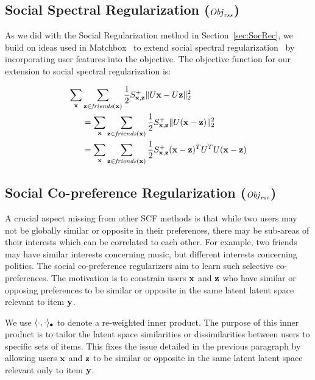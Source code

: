 \subsection{Social Spectral Regularization ($\mathit{Obj}_{\mathit{rss}}$)}

As we did with the Social Regularization method in Section~\ref{sec:SocRec}, we build on ideas used in Matchbox~\cite{matchbox} to extend social spectral regularization~\cite{sr,rrmf} by incorporating user features into the objective. The objective function for our extension to social spectral regularization is:

\begin{align}
\sum_{\mathbf{x}} & \sum_{\mathbf{z} \in \mathit{friends}(\mathbf{x})} \frac{1}{2} S^+_{\mathbf{x},\mathbf{z}} \| U\mathbf{x} - U\mathbf{z} \|_2^2 \nonumber \\
& = \sum_{\mathbf{x}} \sum_{\mathbf{z} \in \mathit{friends}(\mathbf{x})} \frac{1}{2} S^+_{\mathbf{x},\mathbf{z}} \| U (\mathbf{x} - \mathbf{z}) \|_2^2 \nonumber \\
& = \sum_{\mathbf{x}} \sum_{\mathbf{z} \in \mathit{friends}(\mathbf{x})} \frac{1}{2} S^+_{\mathbf{x},\mathbf{z}} (\mathbf{x} - \mathbf{z})^T U^T U (\mathbf{x} - \mathbf{z})
\end{align}

\subsection{Social Co-preference Regularization ($\mathit{Obj}_{\mathit{rsc}}$)}
\label{sec:rsc}

A crucial aspect missing from other SCF methods is that while two users may not be globally similar or opposite 
in their preferences, there may be sub-areas of their interests which can be correlated to each other.
For example, two friends may have similar interests concerning music, but 
different interests concerning politics.  The social co-preference regularizers
aim to learn such selective co-preferences. The motivation is to constrain users $\mathbf{x}$
and $\mathbf{z}$ who have similar or opposing
preferences to be similar or opposite in the same latent latent space
relevant to item $\mathbf{y}$.  

We use $\langle \cdot, \cdot \rangle_{\bullet}$ to denote a re-weighted inner product. The purpose of this inner product is to tailor the latent space similarities or dissimilarities between users to specific sets of items. This fixes the issue detailed in the previous paragraph by allowing users $\mathbf{x}$
and $\mathbf{z}$ to be similar or opposite in the same latent latent space
relevant only to item $\mathbf{y}$.  

